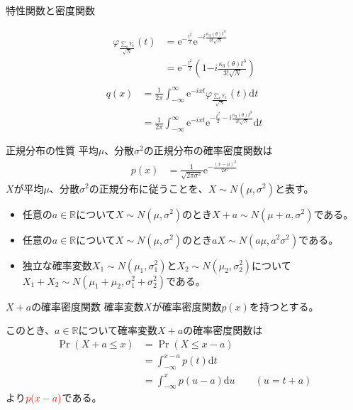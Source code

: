 \documentclass[lualatex,handout]{beamer}
\newcommand{\mycolor}[2]{%
  \begingroup
  \colorlet{currentcolor}{.}%
  \color{#1}#2%
  \color{currentcolor}%
  \endgroup
}
\newcommand{\emm}[1]{\mycolor{red}{#1}}
\theoremstyle{definition}
\begin{document}
\begin{frame}{特性関数と密度関数}

\begin{align*}
\varphi_{\frac{\sum_kY_k}{\sqrt{N}}}(t)
 &= \mathrm{e}^{-\frac{t^2}2}\mathrm{e}^{-i\frac{\kappa_3(\theta)t^3}{3!\sqrt{N}}}\\
 &= \mathrm{e}^{-\frac{t^2}2}\left(1 {-i\frac{\kappa_3(\theta)t^3}{3!\sqrt{N}}}\right)\\
\end{align*}
\begin{align*}
q(x) &= \frac1{2\pi}\int_{-\infty}^\infty \mathrm{e}^{-ixt} \varphi_{\frac{\sum_kY_k}{\sqrt{N}}}(t)\mathrm{d}t\\
&= \frac1{2\pi}\int_{-\infty}^\infty \mathrm{e}^{-ixt} \mathrm{e}^{-\frac{t^2}2 - i\frac{\kappa_3(\theta)t^3}{3!\sqrt{N}}}\mathrm{d}t
\end{align*}
\end{frame}
\fi

\begin{frame}{正規分布の性質}
平均$\mu$、分散$\sigma^2$の正規分布の確率密度関数は
\begin{align*}
p(x) &= \frac1{\sqrt{2\pi\sigma^2}} \mathrm{e}^{-\frac{(x-\mu)^2}{2\sigma^2}}
\end{align*}
$X$が平均$\mu$、分散$\sigma^2$の正規分布に従うことを、$X\sim N(\mu,\sigma^2)$と表す。

\begin{itemize}
\setlength{\itemsep}{2em}
\item 任意の$a\in\mathbb{R}$について$X\sim N(\mu,\sigma^2)$のとき$X+a\sim N(\mu+a,\sigma^2)$である。
\item 任意の$a\in\mathbb{R}$について$X\sim N(\mu,\sigma^2)$のとき$aX\sim N(a\mu,a^2\sigma^2)$である。
\item 独立な確率変数$X_1\sim N(\mu_1, \sigma_1^2)$と$X_2\sim N(\mu_2, \sigma_2^2)$について
$X_1+X_2\sim N(\mu_1+\mu_2, \sigma_1^2+\sigma_2^2)$である。
\end{itemize}
\end{frame}

\begin{frame}{$X+a$の確率密度関数}
\small
確率変数$X$が確率密度関数$p(x)$を持つとする。

このとき、$a\in\mathbb{R}$について確率変数$X+a$の確率密度関数は
\begin{align*}
\Pr(X+a \le x)&= \Pr(X\le x-a)\\
&=\int_{-\infty}^{x-a} p(t) \mathrm{d}t\\
&=\int_{-\infty}^{x} p(u-a) \mathrm{d}u\qquad(u = t+a)
\end{align*}
より$\emm{p(x-a)}$である。
\end{frame}
\end{document}
